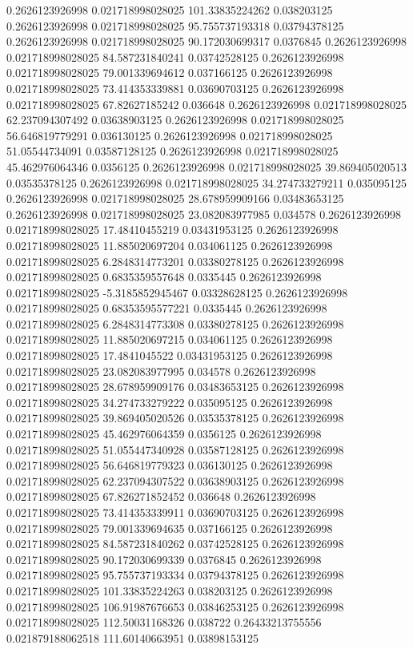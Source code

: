 0.2626123926998 0.021718998028025 101.33835224262 0.038203125
0.2626123926998 0.021718998028025 95.755737193318 0.03794378125
0.2626123926998 0.021718998028025 90.172030699317 0.0376845
0.2626123926998 0.021718998028025 84.587231840241 0.03742528125
0.2626123926998 0.021718998028025 79.001339694612 0.037166125
0.2626123926998 0.021718998028025 73.414353339881 0.03690703125
0.2626123926998 0.021718998028025 67.82627185242 0.036648
0.2626123926998 0.021718998028025 62.237094307492 0.03638903125
0.2626123926998 0.021718998028025 56.646819779291 0.036130125
0.2626123926998 0.021718998028025 51.05544734091 0.03587128125
0.2626123926998 0.021718998028025 45.462976064346 0.0356125
0.2626123926998 0.021718998028025 39.869405020513 0.03535378125
0.2626123926998 0.021718998028025 34.274733279211 0.035095125
0.2626123926998 0.021718998028025 28.678959909166 0.03483653125
0.2626123926998 0.021718998028025 23.082083977985 0.034578
0.2626123926998 0.021718998028025 17.48410455219 0.03431953125
0.2626123926998 0.021718998028025 11.885020697204 0.034061125
0.2626123926998 0.021718998028025 6.2848314773201 0.03380278125
0.2626123926998 0.021718998028025 0.6835359557648 0.0335445
0.2626123926998 0.021718998028025 -5.3185852945467 0.03328628125
0.2626123926998 0.021718998028025 0.68353595577221 0.0335445
0.2626123926998 0.021718998028025 6.2848314773308 0.03380278125
0.2626123926998 0.021718998028025 11.885020697215 0.034061125
0.2626123926998 0.021718998028025 17.4841045522 0.03431953125
0.2626123926998 0.021718998028025 23.082083977995 0.034578
0.2626123926998 0.021718998028025 28.678959909176 0.03483653125
0.2626123926998 0.021718998028025 34.274733279222 0.035095125
0.2626123926998 0.021718998028025 39.869405020526 0.03535378125
0.2626123926998 0.021718998028025 45.462976064359 0.0356125
0.2626123926998 0.021718998028025 51.055447340928 0.03587128125
0.2626123926998 0.021718998028025 56.646819779323 0.036130125
0.2626123926998 0.021718998028025 62.237094307522 0.03638903125
0.2626123926998 0.021718998028025 67.826271852452 0.036648
0.2626123926998 0.021718998028025 73.414353339911 0.03690703125
0.2626123926998 0.021718998028025 79.001339694635 0.037166125
0.2626123926998 0.021718998028025 84.587231840262 0.03742528125
0.2626123926998 0.021718998028025 90.172030699339 0.0376845
0.2626123926998 0.021718998028025 95.755737193334 0.03794378125
0.2626123926998 0.021718998028025 101.33835224263 0.038203125
0.2626123926998 0.021718998028025 106.91987676653 0.03846253125
0.2626123926998 0.021718998028025 112.50031168326 0.038722
0.26433213755556 0.021879188062518 111.60140663951 0.03898153125
